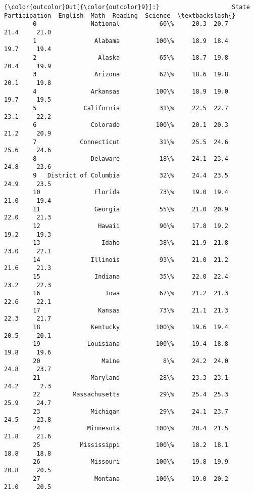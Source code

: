 \documentclass[11pt]{article}
\begin{document}
\begin{Verbatim}[commandchars=\\\{\}]
{\color{outcolor}Out[{\color{outcolor}9}]:}                    State Participation  English  Math  Reading  Science  \textbackslash{}
        0               National           60\%     20.3  20.7     21.4     21.0   
        1                Alabama          100\%     18.9  18.4     19.7     19.4   
        2                 Alaska           65\%     18.7  19.8     20.4     19.9   
        3                Arizona           62\%     18.6  19.8     20.1     19.8   
        4               Arkansas          100\%     18.9  19.0     19.7     19.5   
        5             California           31\%     22.5  22.7     23.1     22.2   
        6               Colorado          100\%     20.1  20.3     21.2     20.9   
        7            Connecticut           31\%     25.5  24.6     25.6     24.6   
        8               Delaware           18\%     24.1  23.4     24.8     23.6   
        9   District of Columbia           32\%     24.4  23.5     24.9     23.5   
        10               Florida           73\%     19.0  19.4     21.0     19.4   
        11               Georgia           55\%     21.0  20.9     22.0     21.3   
        12                Hawaii           90\%     17.8  19.2     19.2     19.3   
        13                 Idaho           38\%     21.9  21.8     23.0     22.1   
        14              Illinois           93\%     21.0  21.2     21.6     21.3   
        15               Indiana           35\%     22.0  22.4     23.2     22.3   
        16                  Iowa           67\%     21.2  21.3     22.6     22.1   
        17                Kansas           73\%     21.1  21.3     22.3     21.7   
        18              Kentucky          100\%     19.6  19.4     20.5     20.1   
        19             Louisiana          100\%     19.4  18.8     19.8     19.6   
        20                 Maine            8\%     24.2  24.0     24.8     23.7   
        21              Maryland           28\%     23.3  23.1     24.2      2.3   
        22         Massachusetts           29\%     25.4  25.3     25.9     24.7   
        23              Michigan           29\%     24.1  23.7     24.5     23.8   
        24             Minnesota          100\%     20.4  21.5     21.8     21.6   
        25           Mississippi          100\%     18.2  18.1     18.8     18.8   
        26              Missouri          100\%     19.8  19.9     20.8     20.5   
        27               Montana          100\%     19.0  20.2     21.0     20.5   

\end{Verbatim}
\end{document}
